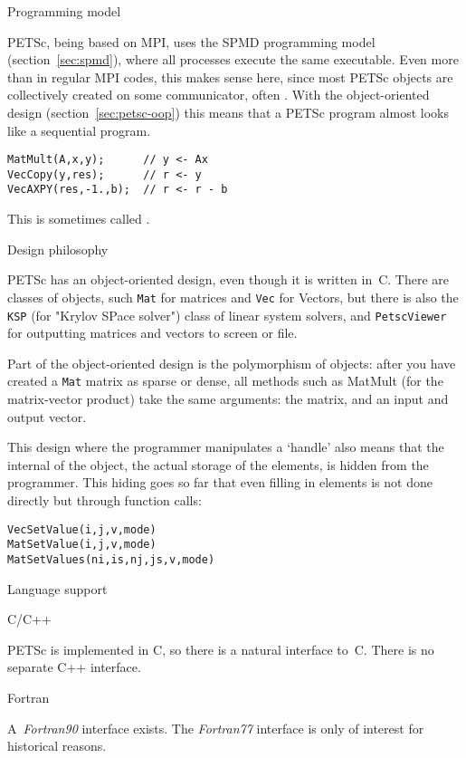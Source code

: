  {Programming model}

PETSc, being based on MPI, uses the \ac{SPMD} programming model
(section~\ref{sec:spmd}), where all processes execute the same
executable. Even more than in regular MPI codes, this makes sense
here, since most PETSc objects are collectively created on some
communicator, often . With the
object-oriented design (section~\ref{sec:petsc-oop}) this means that a
PETSc program almost looks like a sequential program.
\begin{lstlisting}
MatMult(A,x,y);      // y <- Ax
VecCopy(y,res);      // r <- y
VecAXPY(res,-1.,b);  // r <- r - b
\end{lstlisting}
This is
sometimes called .

 {Design philosophy}
\label{sec:petsc-oop}

PETSc has an object-oriented design, even though it is written
in~C. There are classes of objects, such \lstinline{Mat} for
matrices and \lstinline{Vec} for Vectors, but there is also the
\lstinline{KSP} (for "Krylov SPace solver") class of linear system solvers, and
\lstinline{PetscViewer} for outputting matrices and vectors to screen or file.

Part of the object-oriented design is the polymorphism of objects:
after you have created a \lstinline{Mat} matrix as sparse or dense, all methods
such as MatMult (for the matrix-vector product) take the same
arguments: the matrix, and an input and output vector.

This design where the programmer manipulates a `handle' also means
that the internal of the object, the actual storage of the elements,
is hidden from the programmer. This hiding goes so far that even
filling in elements is not done directly but through function calls:
\begin{lstlisting}
VecSetValue(i,j,v,mode)
MatSetValue(i,j,v,mode)
MatSetValues(ni,is,nj,js,v,mode)
\end{lstlisting}

 {Language support}

 {C/C++}

PETSc is implemented in C, so there is a natural interface
to~C. There is no separate C++ interface.

 {Fortran}

A~\emph{Fortran90}
interface exists. The \emph{Fortran77}
interface is only of
interest for historical reasons.


